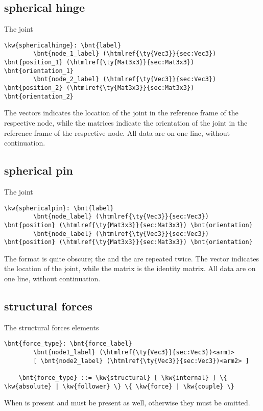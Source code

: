 \subsection{spherical hinge}
The  joint
\begin{Verbatim}[commandchars=\\\{\}]
    \kw{sphericalhinge}: \bnt{label}
        \bnt{node_1_label} (\htmlref{\ty{Vec3}}{sec:Vec3}) \bnt{position_1} (\htmlref{\ty{Mat3x3}}{sec:Mat3x3}) \bnt{orientation_1}
        \bnt{node_2_label} (\htmlref{\ty{Vec3}}{sec:Vec3}) \bnt{position_2} (\htmlref{\ty{Mat3x3}}{sec:Mat3x3}) \bnt{orientation_2}
\end{Verbatim}
The  vectors indicates the location of the joint
in the reference frame of the respective node,
while the  matrices indicate the orientation of the joint
in the reference frame of the respective node.
All data are on one line, without continuation.

\subsection{spherical pin}
The  joint
\begin{Verbatim}[commandchars=\\\{\}]
    \kw{sphericalpin}: \bnt{label}
        \bnt{node_label} (\htmlref{\ty{Vec3}}{sec:Vec3}) \bnt{position} (\htmlref{\ty{Mat3x3}}{sec:Mat3x3}) \bnt{orientation}
        \bnt{node_label} (\htmlref{\ty{Vec3}}{sec:Vec3}) \bnt{position} (\htmlref{\ty{Mat3x3}}{sec:Mat3x3}) \bnt{orientation}
\end{Verbatim}
The format is quite obscure; the  and the 
are repeated twice.
The vector  indicates the location of the joint,
while the matrix  is the identity matrix.
All data are on one line, without continuation.

\subsection{structural forces}
The structural forces elements
\begin{Verbatim}[commandchars=\\\{\}]
    \bnt{force_type}: \bnt{force_label}
        \bnt{node1_label} (\htmlref{\ty{Vec3}}{sec:Vec3})<arm1>
        [ \bnt{node2_label} (\htmlref{\ty{Vec3}}{sec:Vec3})<arm2> ]

    \bnt{force_type} ::= \kw{structural} [ \kw{internal} ] \{ \kw{absolute} | \kw{follower} \} \{ \kw{force} | \kw{couple} \}
\end{Verbatim}
When  is present  and  must be present
as well, otherwise they must be omitted.

